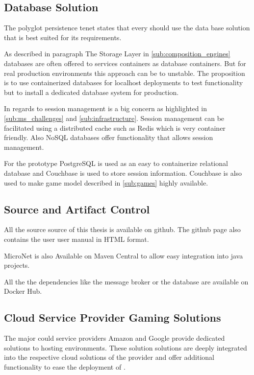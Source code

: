 \subsection{Database Solution}

The polyglot persistence tenet states that every \ms{} should use the data base
solution that is best suited for its requirements.

As described in paragraph The Storage Layer in \autoref{sub:composition_engines}
databases are often offered to services containers as database containers. But
for real production environments this approach can be to
unstable\cite{cazorla2017db_containers}. The proposition is to use containerized
databases for localhost deployments to test functionality but to install a
dedicated database system for production.

In regards to \og{} session management is a big concern as highlighted in
\autoref{sub:ms_challenges} and \autoref{sub:infrastructure}. Session management
can be facilitated using a distributed cache such as Redis which is very
container friendly. Also NoSQL databases offer functionality that allows session
management.

For the prototype PostgreSQL is used as an easy to containerize relational
database and Couchbase is used to store session information. Couchbase is also
used to make game model described in \autoref{sub:games} highly available.

\subsection{Source and Artifact Control}

All the source source of this thesis is available on
github\cite{micronet2017doku}. The github page also contains the user user
manual in HTML format.

MicroNet is also Available on Maven Central to allow easy integration into java
projects.

All the the dependencies like the message broker or the database are available
on Docker Hub.

\subsection{Cloud Service Provider Gaming Solutions}

The major could service providers Amazon and Google provide dedicated solutions
to hosting \og{} environments. These solution solutions are deeply integrated
into the respective cloud solutions of the provider and offer additional
functionality to ease the deployment of \ogs{}.


